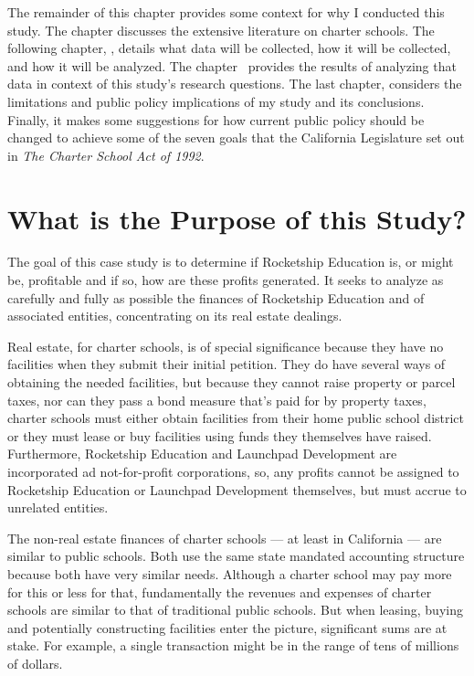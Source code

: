 The remainder of this chapter provides some context for why I conducted this study. The chapter \textit{} discusses the extensive literature on charter schools. The following chapter, \textit{}, details what data will be collected, how it will be collected, and how it will be analyzed. The chapter~\textit{} provides the results of analyzing that data in context of this study's research questions. The last chapter, \textit{} considers the limitations and public policy implications of my study and its conclusions. Finally, it makes some suggestions for how current public policy should be changed to achieve some of the seven goals that the California Legislature set out in \textit{The Charter School Act of 1992}.

\section{What is the Purpose of this Study?}\indent
The goal of this case study is to determine if Rocketship Education is, or might be, profitable and if so, how are these profits generated. It seeks to analyze as carefully and fully as possible the finances of Rocketship Education and of associated entities, concentrating on its real estate dealings.

Real estate, for charter schools, is of special significance because they have no facilities when they submit their initial petition. They do have several ways of obtaining the needed facilities, but because they cannot raise property or parcel taxes, nor can they pass a bond measure that's paid for by property taxes, charter schools must either obtain facilities from their home public school district or they must lease or buy facilities using funds they themselves have raised. Furthermore, Rocketship Education and Launchpad Development are incorporated ad not-for-profit corporations, so, any profits cannot be assigned to Rocketship Education or Launchpad Development themselves, but must accrue to unrelated entities.

The non-real estate finances of charter schools — at least in California — are similar to public schools. Both use the same state mandated accounting structure because both have very similar needs. Although a charter school may pay more for this or less for that, fundamentally the revenues and expenses of charter schools are similar to that of traditional public schools. But when leasing, buying and potentially constructing facilities  enter the picture, significant sums are at stake. For example, a single transaction might be in the range of tens of millions of dollars.

